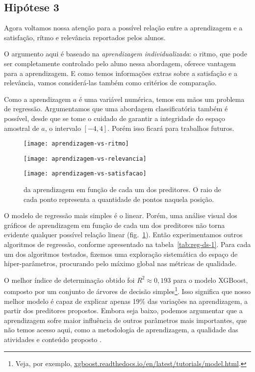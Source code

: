 \subsection{Hipótese 3}

Agora voltamos nossa atenção para a possível relação entre a aprendizagem e a satisfação, rítmo e relevância reportados pelos alunos.

O argumento aqui é baseado na \emph{aprendizagem individualizada}: o ritmo, que pode ser completamente controlado pelo aluno nessa abordagem, oferece vantagem para a aprendizagem.
E como temos informações extras sobre a satisfação e a relevância, vamos considerá-las também como critérios de comparação.

Como a aprendizagem $a$ é uma variável numérica, temos em mãos um problema de regressão.
Argumentamos que uma abordagem classificatória também é possível, desde que se tome o cuidado de garantir a integridade do espaço amostral de $a$, o intervalo $[-4,4]$.
Porém isso ficará para trabalhos futuros.

\begin{figure}[t]
	\centering

	\texttt{[image: aprendizagem-vs-ritmo]}

	\texttt{[image: aprendizagem-vs-relevancia]}

	\texttt{[image: aprendizagem-vs-satisfacao]}

	\caption{ da aprendizagem em função de cada um dos preditores. O raio de cada ponto representa a quantidade de pontos naquela posição.}
	\label{fig:bubble-plots}
\end{figure}

O modelo de regressão mais simples é o linear.
Porém, uma análise visual dos gráficos de aprendizagem em função de cada um dos preditores não torna evidente qualquer possível relação linear (fig.~\ref{fig:bubble-plots}).
Então experimentamos outros algoritmos de regressão, conforme apresentado na tabela~\ref{tab:reg-ds-1}.
Para cada um dos algoritmos testados, fizemos uma exploração sistemática do espaço de hiper-parâmetros, procurando pelo máximo global nas métricas de qualidade.

O melhor índice de determinação obtido foi $R^2 \approx 0,193$ para o modelo XGBoost, composto por um conjunto de árvores de decisão simples\footnote{Veja, por exemplo, \url{xgboost.readthedocs.io/en/latest/tutorials/model.html}.}.
Isso significa que nosso melhor modelo é capaz de explicar apenas 19\% das variações na aprendizagem, a partir dos preditores propostos.
Embora seja baixo, podemos argumentar  que a aprendizagem sofre maior influência de outros parâmetros mais importantes, que não temos acesso aqui, como a metodologia de aprendizagem, a qualidade das atividades e conteúdo proposto \etc.

